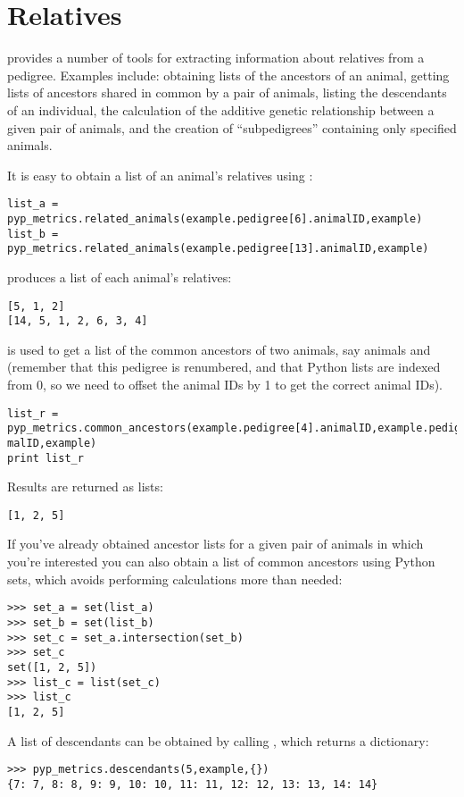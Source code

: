 \section{Relatives}\label{sec:computing-relatives}
\PyPedal{} provides a number of tools for extracting information about relatives from a pedigree. Examples include: obtaining lists of the ancestors of an animal, getting lists of ancestors shared in common by a pair of animals, listing the descendants of an individual, the calculation of the additive genetic relationship between a given pair of animals, and the creation of ``subpedigrees'' containing only specified animals.

It is easy to obtain a list of an animal's relatives using :
\begin{verbatim}
list_a = pyp_metrics.related_animals(example.pedigree[6].animalID,example)
list_b = pyp_metrics.related_animals(example.pedigree[13].animalID,example)
\end{verbatim}
produces a list of each animal's relatives:
\begin{verbatim}
[5, 1, 2]
[14, 5, 1, 2, 6, 3, 4]
\end{verbatim}
 is used to get a list of the common ancestors of two animals, say animals  and  (remember that this pedigree is renumbered, and that Python lists are indexed from 0, so we need to offset the animal IDs by 1 to get the correct animal IDs).
\begin{verbatim}
list_r = pyp_metrics.common_ancestors(example.pedigree[4].animalID,example.pedigree[13].ani
malID,example)
print list_r
\end{verbatim}
Results are returned as lists:
\begin{verbatim}
[1, 2, 5]
\end{verbatim}
If you've already obtained ancestor lists for a given pair of animals in which you're interested you can also obtain a list of common ancestors using Python sets, which avoids performing calculations more than needed:
\begin{verbatim}
>>> set_a = set(list_a)
>>> set_b = set(list_b)
>>> set_c = set_a.intersection(set_b)
>>> set_c
set([1, 2, 5])
>>> list_c = list(set_c)
>>> list_c
[1, 2, 5]
\end{verbatim}
A list of descendants can be obtained by calling , which returns a dictionary:
\begin{verbatim}
>>> pyp_metrics.descendants(5,example,{})
{7: 7, 8: 8, 9: 9, 10: 10, 11: 11, 12: 12, 13: 13, 14: 14}
\end{verbatim}

